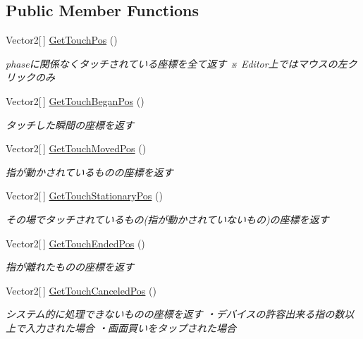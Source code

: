 \subsection*{Public Member Functions}
\begin{DoxyCompactItemize}
\item 
Vector2\mbox{[}$\,$\mbox{]} \hyperlink{class_touch_manager_a371933c19da690aa29afd51e26d3b75d}{Get\+Touch\+Pos} ()
\begin{DoxyCompactList}\small\item\em phaseに関係なくタッチされている座標を全て返す ※ Editor上ではマウスの左クリックのみ \end{DoxyCompactList}\item 
Vector2\mbox{[}$\,$\mbox{]} \hyperlink{class_touch_manager_a437d9f0a5edca24ce7d6ebea4a30ad9e}{Get\+Touch\+Began\+Pos} ()
\begin{DoxyCompactList}\small\item\em タッチした瞬間の座標を返す \end{DoxyCompactList}\item 
Vector2\mbox{[}$\,$\mbox{]} \hyperlink{class_touch_manager_af11c43ea9bc782327ad8ff5a4f151889}{Get\+Touch\+Moved\+Pos} ()
\begin{DoxyCompactList}\small\item\em 指が動かされているものの座標を返す \end{DoxyCompactList}\item 
Vector2\mbox{[}$\,$\mbox{]} \hyperlink{class_touch_manager_acdb18fa5fb6c7cc8a4ca06b3c52c53ab}{Get\+Touch\+Stationary\+Pos} ()
\begin{DoxyCompactList}\small\item\em その場でタッチされているもの(指が動かされていないもの)の座標を返す \end{DoxyCompactList}\item 
Vector2\mbox{[}$\,$\mbox{]} \hyperlink{class_touch_manager_aab5c384a916bb37c0a8c1c74f9e1b319}{Get\+Touch\+Ended\+Pos} ()
\begin{DoxyCompactList}\small\item\em 指が離れたものの座標を返す \end{DoxyCompactList}\item 
Vector2\mbox{[}$\,$\mbox{]} \hyperlink{class_touch_manager_a3cc9927c0c93ffc52e516b2322b06fb7}{Get\+Touch\+Canceled\+Pos} ()
\begin{DoxyCompactList}\small\item\em システム的に処理できないものの座標を返す ・デバイスの許容出来る指の数以上で入力された場合 ・画面買いをタップされた場合 \end{DoxyCompactList}\item 

\end{DoxyCompactItemize}
